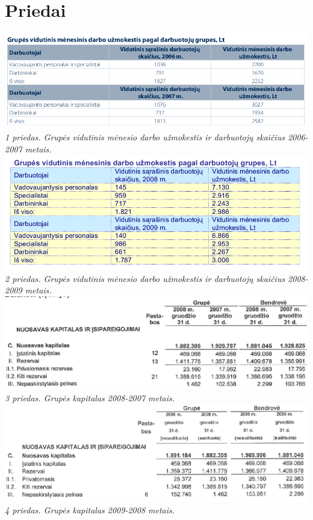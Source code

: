 \documentclass[11pt,a4paper]{article}
\begin{document}
\section*{Priedai}
\includegraphics[width=460pt]{grupes_vidutinis_menesinis_darbo_uzmokestis_2006_2007.png}\\
\textsl{1 priedas. Grupės vidutinis mėnesio darbo užmokestis ir darbuotojų skaičius 2006-2007 metais.}\\
\includegraphics[width=460pt]{grupes_vidutinis_menesinis_darbo_uzmokestis_2008_2009.png}\\
\textsl{2 priedas. Grupės vidutinis mėnesio darbo užmokestis ir darbuotojų skaičius 2008-2009 metais.}\\
\includegraphics[width=460pt]{kapitalas_2008_2007.png}\\
\textsl{3 priedas. Grupės kapitalas 2008-2007 metais.}\\
\includegraphics[width=460pt]{kapitalas_2009_2008.png}\\
\textsl{4 priedas. Grupės kapitalas 2009-2008 metais.}\\
\end{document}
